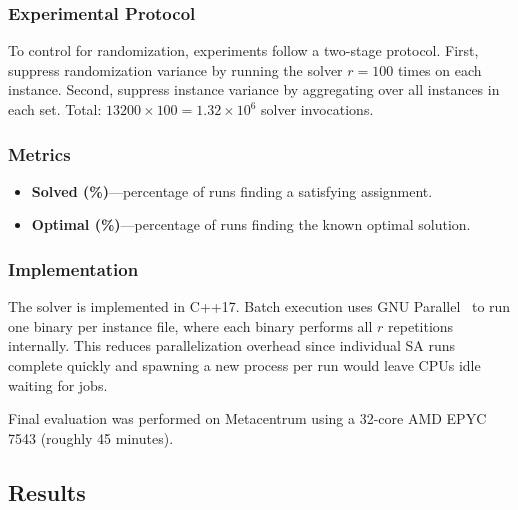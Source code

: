 \documentclass[11pt]{article}
\begin{document}
    \subsubsection{Experimental Protocol}

    To control for randomization, experiments follow a two-stage protocol.
    First, suppress randomization variance by running the solver $r = 100$ times on each instance.
    Second, suppress instance variance by aggregating over all instances in each set.
    Total: $13200 \times 100 = 1.32 \times 10^6$ solver invocations.

    \subsubsection{Metrics}

    \begin{itemize}
        \item \textbf{Solved (\%)}---percentage of runs finding a satisfying assignment.
        \item \textbf{Optimal (\%)}---percentage of runs finding the known optimal solution.
    \end{itemize}

    \subsubsection{Implementation}

    The solver is implemented in C++17.
    Batch execution uses GNU Parallel~\cite{tange_2025_18039569}
    to run one binary per instance file, where each binary performs all $r$ repetitions internally.
    This reduces parallelization overhead since individual SA runs complete quickly and spawning
    a new process per run would leave CPUs idle waiting for jobs.

    Final evaluation was performed on Metacentrum using a 32-core AMD EPYC 7543 (roughly 45 minutes).

    \subsection{Results}
\end{document}
